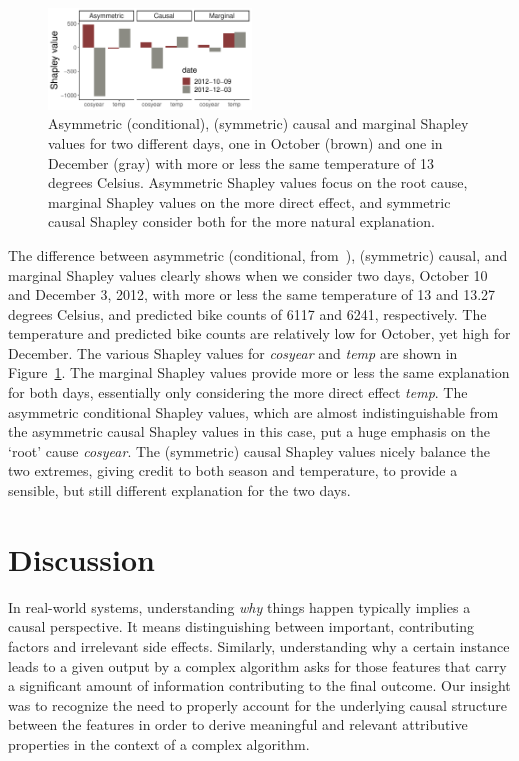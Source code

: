 \documentclass{article}
\begin{document}
\begin{figure}
	\begin{center}
		\includegraphics[width=0.48\textwidth]{figures/final_bar_plots.pdf}
	\end{center}
	\caption{Asymmetric (conditional), (symmetric) causal and marginal Shapley values for two different days, one in October (brown) and one in December (gray) with more or less the same temperature of 13 degrees Celsius. Asymmetric Shapley values focus on the root cause, marginal Shapley values on the more direct effect, and symmetric causal Shapley consider both for the more natural explanation.}
	\label{fig:barplots}
\end{figure}
The difference between asymmetric (conditional, from~\cite{frye2019asymmetric}), (symmetric) causal, and marginal Shapley values clearly shows when we consider two days, October 10 and December 3, 2012, with more or less the same temperature of 13 and 13.27 degrees Celsius, and predicted bike counts of 6117 and 6241, respectively. The temperature and predicted bike counts are relatively low for October, yet high for December. The various Shapley values for {\em cosyear} and {\em temp} are shown in Figure~\ref{fig:barplots}. The marginal Shapley values provide more or less the same explanation for both days, essentially only considering the more direct effect {\em temp}. The asymmetric conditional Shapley values, which are almost indistinguishable from the asymmetric causal Shapley values in this case, put a huge emphasis on the `root' cause {\em cosyear}. The (symmetric) causal Shapley values nicely balance the two extremes, giving credit to both season and temperature, to provide a sensible, but still different explanation for the two days.

\section{Discussion}

In real-world systems, understanding {\em why} things happen typically implies a causal perspective. It means distinguishing between important, contributing factors and irrelevant side effects. Similarly, understanding why a certain instance leads to a given output by a complex algorithm asks for those features that carry a significant amount of information contributing to the final outcome. Our insight was to recognize the need to properly account for the underlying causal structure between the features in order to derive meaningful and relevant attributive properties in the context of a complex algorithm.
\end{document}
